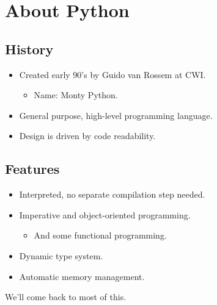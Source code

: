 \documentclass[aspectratio=1610,slidestop]{beamer}
\begin{document}
\section{About Python}

\subsection{History}
\begin{pframe}
 \begin{itemize}
  \item Created early 90's by Guido van Rossem at CWI.
  \begin{itemize}
   \item Name: Monty Python.
  \end{itemize}
  \item General purpose, high-level programming language.
  \item Design is driven by code readability.
 \end{itemize}

\end{pframe}


\subsection{Features}
\begin{pframe}
 \begin{itemize}
  \item Interpreted, no separate compilation step needed.
  \item Imperative and object-oriented programming.
  \begin{itemize}
   \item And some functional programming.
  \end{itemize}
  \item Dynamic type system.
  \item Automatic memory management.
 \end{itemize}
 We'll come back to most of this.
\end{pframe}
\end{document}
